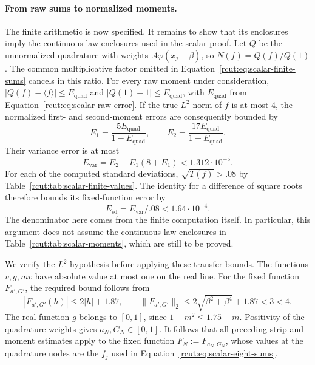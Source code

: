\paragraph{From raw sums to normalized moments.}
The finite arithmetic is now specified. It remains to show that its
enclosures imply the continuous-law enclosures used in the scalar proof.
Let \(Q\) be the unnormalized quadrature with weights
\(.4\varphi(x_j-\beta)\), so \(N(f)=Q(f)/Q(1)\).
The common multiplicative factor omitted in
Equation~\eqref{rcut:eq:scalar-finite-sums} cancels in this ratio.
For every raw moment under consideration,
\(|Q(f)-\langle f\rangle|\leq E_{\mathrm{quad}}\) and
\(|Q(1)-1|\leq E_{\mathrm{quad}}\), with \(E_{\mathrm{quad}}\) from
Equation~\eqref{rcut:eq:scalar-raw-error}.
If the true \(L^2\) norm of \(f\) is at most 4, the normalized first-
and second-moment errors are consequently bounded by
\[
 E_1=\frac{5E_{\mathrm{quad}}}{1-E_{\mathrm{quad}}},\qquad
 E_2=\frac{17E_{\mathrm{quad}}}{1-E_{\mathrm{quad}}}.
\]
Their variance error is at most
\begin{equation}
 E_{\mathrm{var}}=E_2+E_1(8+E_1)
 <1.312\cdot10^{-5}.
 \label{rcut:eq:scalar-variance-error}
\end{equation}
For each of the computed standard deviations,
\(\sqrt{T(f)}>.08\) by Table~\ref{rcut:tab:scalar-finite-values}.
The identity for a difference of square roots therefore bounds its
fixed-function error by
\begin{equation}
 E_{\mathrm{sd}}=E_{\mathrm{var}}/.08
 <1.64\cdot10^{-4}.
 \label{rcut:eq:scalar-sd-error}
\end{equation}
The denominator here comes from the finite computation itself. In
particular, this argument does not assume the continuous-law enclosures
in Table~\ref{rcut:tab:scalar-moments}, which are still to be proved.

We verify the \(L^2\) hypothesis before applying these transfer bounds.
The functions \(v,g,mv\) have absolute value at most one on the real
line. For the fixed function \(F_{a',G'}\), the required bound follows
from
\[
 |F_{a',G'}(h)|\leq2|h|+1.87,
 \qquad
 \|F_{a',G'}\|_2
 \leq2\sqrt{\beta^2+\beta^4}+1.87<3<4.
\]
The real function \(g\) belongs to \([0,1]\), since
\(1-m^2\leq1.75-m\). Positivity of the quadrature weights gives
\(a_N,G_N\in[0,1]\). It follows that all preceding strip and moment
estimates apply to the fixed function
\(F_N:=F_{a_N,G_N}\), whose values at the quadrature nodes are
the \(f_j\) used in Equation~\eqref{rcut:eq:scalar-eight-sums}.

